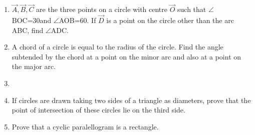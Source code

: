 \begin{enumerate}[label=\thesection.\arabic*,ref=\thesection.\theenumi]
\item  $\vec{A},\vec{B},\vec{C}$ are the three points on a circle with centre $\vec{O}$ such that $\angle$BOC=30\degree and $\angle$AOB=60\degree. If $\vec{D}$ is a point on the circle other than the arc ABC, find $\angle$ADC.
\label{chapters/9/10/5/1}
\\
\solution

\item A chord of a circle is equal to the radius of the circle. Find the angle subtended by the chord at a point on the minor arc and also at a point on the major arc.
\label{chapters/9/10/5/2}
\\
\solution


\item 
\label{chapters/9/10/5/3}

\item If circles are drawn taking two sides of a triangle as diameters, prove that the point of intersection of these circles lie on the third side.
\label{chapters/9/10/5/10}
\\
\solution

    \item Prove that a cyclic paralellogram is a rectangle.
\label{chapters/9/10/5/12}
\\
\solution


\end{enumerate}
